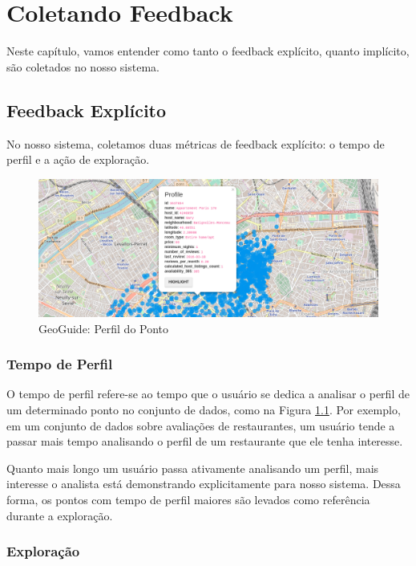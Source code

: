\chapter{Coletando Feedback}
\label{chap:coletando}

Neste capítulo, vamos entender como tanto o feedback explícito, quanto implícito, são coletados no nosso sistema.

\section{Feedback Explícito}

No nosso sistema, coletamos duas métricas de feedback explícito: o tempo de perfil e a ação de exploração.

\begin{figure}[t]
	\centering
	\includegraphics[width=\columnwidth]{imagens/perfil-do-ponto}
	\caption{GeoGuide: Perfil do Ponto}
	\label{fig:perfil-do-ponto}
	\vspace{-10pt}
\end{figure}

\subsection{Tempo de Perfil}

O tempo de perfil refere-se ao tempo que o usuário se dedica a analisar o perfil de um determinado ponto no conjunto de dados, como na Figura \ref{fig:perfil-do-ponto}. Por exemplo, em um conjunto de dados sobre avaliações de restaurantes, um usuário tende a passar mais tempo analisando o perfil de um restaurante que ele tenha interesse.

Quanto mais longo um usuário passa ativamente analisando um perfil, mais interesse o analista está demonstrando explicitamente para nosso sistema. Dessa forma, os pontos com tempo de perfil maiores são levados como referência durante a exploração.

\subsection{Exploração}

